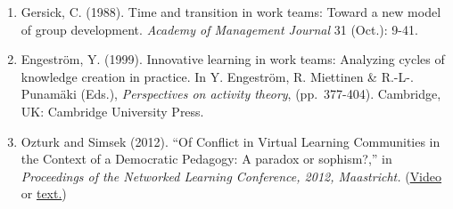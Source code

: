 \begin{enumerate}
\def\labelenumi{\arabic{enumi}.}
\item
  Gersick, C. (1988). Time and transition in work teams: Toward a new
  model of group development. \emph{Academy of Management Journal} 31
  (Oct.): 9-41.
\item
  Engeström, Y. (1999). Innovative learning in work teams: Analyzing
  cycles of knowledge creation in practice. In Y. Engeström, R.
  Miettinen \& R.-L-. Punamäki (Eds.), \emph{Perspectives on activity
  theory}, (pp.~377-404). Cambridge, UK: Cambridge University Press.
\item
  Ozturk and Simsek (2012). ``Of Conflict in Virtual Learning
  Communities in the Context of a Democratic Pedagogy: A paradox or
  sophism?,'' in \emph{Proceedings of the Networked Learning Conference,
  2012, Maastricht.}
  (\href{http://www.lancaster.ac.uk/fass/edres/seminars/Ozturk300311.htm}{Video}
  or
  \href{http://networkedlearningconference.org.uk/abstracts/pdf/ozturk.pdf}{text.})
\end{enumerate}
